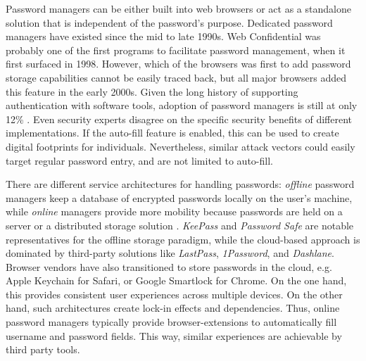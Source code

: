 Password managers can be either built into web browsers or act as a standalone solution that is independent of the password's purpose. Dedicated password managers have existed since the mid to late 1990s. Web Confidential was probably one of the first programs to facilitate password management, when it first surfaced in 1998. However, which of the browsers was first to add password storage capabilities cannot be easily traced back, but all major browsers added this feature in the early 2000s. Given the long history of supporting authentication with software tools, adoption of password managers is still at only 12\% \cite{Olmstead2017AmerciansCybersecurity}. Even security experts disagree on the specific security benefits of different implementations. If the auto-fill feature is enabled, this can be used to create digital footprints for individuals. Nevertheless, similar attack vectors could easily target regular password entry, and are not limited to auto-fill. 

There are different service architectures for handling passwords: \textit{offline} password managers keep a database of encrypted passwords locally on the user's machine, while \textit{online} managers provide more mobility because passwords are held on a server or a distributed storage solution \cite{McCarney2012Tapas}. \textit{KeePass} and \textit{Password Safe} are notable representatives for the offline storage paradigm, while the cloud-based approach is dominated by third-party solutions like \textit{LastPass}, \textit{1Password}, and \textit{Dashlane}. Browser vendors have also transitioned to store passwords in the cloud, e.g. Apple Keychain for Safari, or Google Smartlock for Chrome. On the one hand, this provides consistent user experiences across multiple devices. On the other hand, such architectures create lock-in effects and dependencies. Thus, online password managers typically provide browser-extensions to automatically fill username and password fields. This way, similar experiences are achievable by third party tools. 

